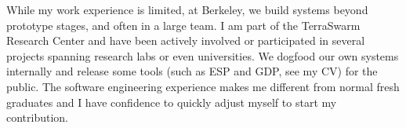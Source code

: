 \documentclass[11pt, letterpaper]{awesome-cv}
\begin{document}
\begin{cvletter}
  While my work experience is limited, at Berkeley, we build systems beyond
  prototype stages, and often in a large team. I am part of the TerraSwarm
  Research Center and have been actively involved or participated in several
  projects spanning research labs or even universities. We dogfood our own
  systems internally and release some tools (such as ESP and GDP, see my CV) for
  the public. The software engineering experience makes me different from normal
  fresh graduates and I have confidence to quickly adjust myself to start my
  contribution.

\end{cvletter}

\makeletterclosing
\end{document}
